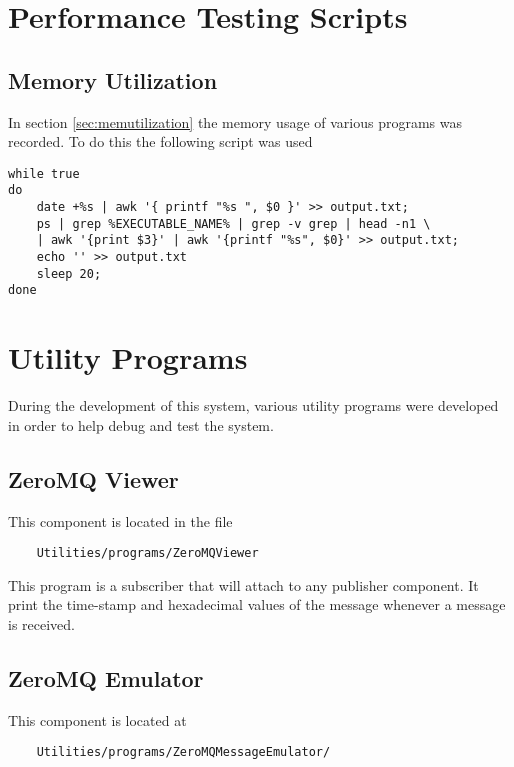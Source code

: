 \chapter{Performance Testing Scripts}

\section{Memory Utilization}

In section \ref{sec:memutilization} the memory usage of various programs was recorded. To do this the following script was used

\begin{verbatim}
while true
do
	date +%s | awk '{ printf "%s ", $0 }' >> output.txt;
	ps | grep %EXECUTABLE_NAME% | grep -v grep | head -n1 \
	| awk '{print $3}' | awk '{printf "%s", $0}' >> output.txt;
	echo '' >> output.txt
	sleep 20;
done

\end{verbatim}

\chapter{Utility Programs}

During the development of this system, various utility programs were developed in order to help debug and test the system.

\section{ZeroMQ Viewer}

This component is located in the file 

\begin{verbatim}
	Utilities/programs/ZeroMQViewer
\end{verbatim}

This program is a subscriber that will attach to any publisher component. It print the time-stamp and hexadecimal values of the message whenever a message is received.

\section{ZeroMQ Emulator}

This component is located at 

\begin{verbatim}
	Utilities/programs/ZeroMQMessageEmulator/
\end{verbatim}

